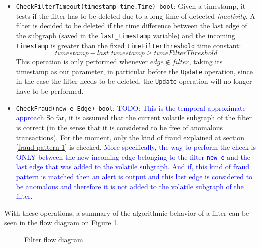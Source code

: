 \begin{itemize}
    \item \texttt{CheckFilterTimeout(timestamp time.Time) bool}: Given a timestamp, it tests if the filter has to be deleted due to a long time of detected \textit{inactivity}. A filter is decided to be deleted if the time difference between the last edge of the subgraph (saved in the \texttt{last\_timestamp} variable) and the incoming \texttt{timestamp} is greater than the fixed \texttt{timeFilterThreshold} time constant: $$timestamp - last\_timestamp \geq timeFilterThreshold$$
    This operation is only performed whenever $edge \notin filter$, taking its timestamp as our parameter, in particular before the \texttt{Update} operation, since in the case the filter needs to be deleted, the \texttt{Update} operation will no longer have to be performed.

    \item \texttt{CheckFraud(new\_e Edge) bool}: \textcolor{blue}{TODO: This is the temporal approximate approach} So far, it is assumed that the current volatile subgraph of the filter is correct (in the sense that it is considered to be free of anomalous transactions). For the moment, only the kind of fraud explained at section \ref{fraud-pattern-1} is checked. \textcolor{blue}{More specifically, the way to perform the check is ONLY between the new incoming edge belonging to the filter \texttt{new\_e} and the last edge that was added to the volatile subgraph. And if, this kind of fraud pattern is matched then an alert is output and this last edge is considered to be anomalous and therefore it is not added to the volatile subgraph of the filter}. 
    
\end{itemize}

With these operations, a summary of the algorithmic behavior of a filter can be seen in the flow diagram on Figure \ref{diag:filter-flow}.

\begin{figure}[H]
    \centering
    
    \caption{Filter flow diagram}
    \label{diag:filter-flow}
\end{figure}

